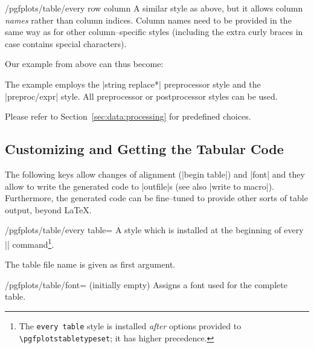 \begin{stylekey}{/pgfplots/table/every row  column }
	A similar style as above, but it allows column \emph{names} rather than column indices. Column names need to be provided in the same way as for other column--specific styles (including the extra curly braces in case  contains special characters).

	Our example from above can thus become:
\begin{codeexample}[]
\end{codeexample}
	The example employs the |string replace*| preprocessor style and the |preproc/expr| style. All preprocessor or postprocessor styles can be used. 

	Please refer to Section~\ref{sec:data:processing} for predefined choices.
\end{stylekey}

\subsection{Customizing and Getting the Tabular Code}
The following keys allow changes of alignment (|begin table|) and |font| and they allow to write the generated code to |outfile|s (see also |write to macro|). Furthermore, the generated code can be fine--tuned to provide other sorts of table output, beyond \LaTeX.
\begin{stylekey}{/pgfplots/table/every table=}
	A style which is installed at the beginning of every |\pgfplotstabletypeset| command\footnote{The \texttt{every table} style is installed \emph{after} options provided to \texttt{\textbackslash pgfplotstabletypeset}; it has higher precedence.}.

	The table file name is given as first argument.
\end{stylekey}

\begin{key}{/pgfplots/table/font= (initially empty)}
	Assigns a font used for the complete table.
\end{key}

